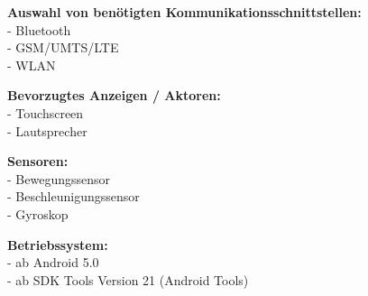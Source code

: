 \textbf{Auswahl von benötigten Kommunikationsschnittstellen:}\\
- Bluetooth\\
- \gls{GSM}/\gls{UMTS}/\gls{LTE}\\
- \gls{WLAN}

\textbf{Bevorzugtes Anzeigen / Aktoren:}\\
- Touchscreen\\
- Lautsprecher

\textbf{Sensoren:}\\
- Bewegungssensor\\
- Beschleunigungssensor\\
- Gyroskop

\textbf{Betriebssystem:}\\
- ab Android 5.0\\
- ab \gls{SDK} Tools Version 21 (Android Tools)

\newpage
